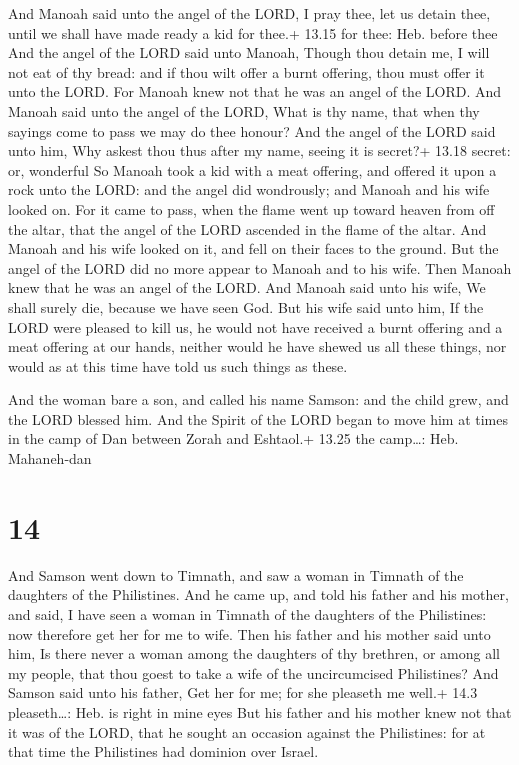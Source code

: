  And Manoah said unto the angel of the LORD, I pray thee,
let us detain thee, until we shall have made ready a kid for thee.+
13.15 for thee: Heb. before thee  And the angel of the LORD
said unto Manoah, Though thou detain me, I will not eat of thy bread:
and if thou wilt offer a burnt offering, thou must offer it unto the
LORD. For Manoah knew not that he was an angel of the LORD.
 And Manoah said unto the angel of the LORD, What is thy
name, that when thy sayings come to pass we may do thee honour?
 And the angel of the LORD said unto him, Why askest thou
thus after my name, seeing it is secret?+ 13.18 secret: or, wonderful
 So Manoah took a kid with a meat offering, and offered it
upon a rock unto the LORD: and the angel did wondrously; and Manoah and
his wife looked on.  For it came to pass, when the flame
went up toward heaven from off the altar, that the angel of the LORD
ascended in the flame of the altar. And Manoah and his wife looked on
it, and fell on their faces to the ground.  But the angel
of the LORD did no more appear to Manoah and to his wife. Then Manoah
knew that he was an angel of the LORD.  And Manoah said
unto his wife, We shall surely die, because we have seen God.
 But his wife said unto him, If the LORD were pleased to
kill us, he would not have received a burnt offering and a meat offering
at our hands, neither would he have shewed us all these things, nor
would as at this time have told us such things as these.

 And the woman bare a son, and called his name Samson:
and the child grew, and the LORD blessed him.  And the
Spirit of the LORD began to move him at times in the camp of Dan between
Zorah and Eshtaol.+ 13.25 the camp\ldots: Heb. Mahaneh-dan

\hypertarget{section-13}{%
\section{14}\label{section-13}}

 And Samson went down to Timnath, and saw a woman in Timnath
of the daughters of the Philistines.  And he came up, and
told his father and his mother, and said, I have seen a woman in Timnath
of the daughters of the Philistines: now therefore get her for me to
wife.  Then his father and his mother said unto him, Is
there never a woman among the daughters of thy brethren, or among all my
people, that thou goest to take a wife of the uncircumcised Philistines?
And Samson said unto his father, Get her for me; for she pleaseth me
well.+ 14.3 pleaseth\ldots: Heb. is right in mine eyes  But
his father and his mother knew not that it was of the LORD, that he
sought an occasion against the Philistines: for at that time the
Philistines had dominion over Israel.

